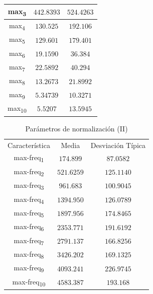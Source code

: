 \documentclass[12pt]{article}
\begin{document}
\begin{table}[!ht]
\begin{tabular}{||c c c||}
			\hline
			max\textsubscript{3} & $442.8393$ & $524.4263$ \\
			\hline
			max\textsubscript{4} & $130.525$ & $192.106$ \\
			\hline
			max\textsubscript{5} & $129.601$ & $179.401$ \\
			\hline
			max\textsubscript{6} & $19.1590$ & $36.384$ \\
			\hline
			max\textsubscript{7} & $22.5892$ & $40.294$ \\
			\hline
			max\textsubscript{8} & $13.2673$ & $21.8992$ \\
			\hline
			max\textsubscript{9} & $5.34739$ & $10.3271$ \\
			\hline
			max\textsubscript{10} & $5.5207$ & $13.5945$ \\
			\hline
		\end{tabular}
	\label{Tab:Features_2_1}
\end{table}

\begin{table}[!ht]
	\caption{Parámetros de normalización (II)}
	\centering
		\begin{tabular}{||c c c||}
			\hline
			Característica & Media & Desviación Típica  \\ [0.5ex]
			max-freq\textsubscript{1} & $174.899$ & $87.0582$ \\
			\hline
			max-freq\textsubscript{2} & $521.6259$ & $125.1140$ \\
			\hline
			max-freq\textsubscript{3} & $961.683$ & $100.9045$ \\
			\hline
			max-freq\textsubscript{4} & $1394.950$ & $126.0789$ \\
			\hline
			max-freq\textsubscript{5} & $1897.956$ & $174.8465$ \\
			\hline
			max-freq\textsubscript{6} & $2353.771$ & $191.6192$ \\
			\hline
			max-freq\textsubscript{7} & $2791.137$ & $166.8256$ \\
			\hline
			max-freq\textsubscript{8} & $3426.202$ & $169.1325$ \\
			\hline
			max-freq\textsubscript{9} & $4093.241$ & $226.9745$ \\
			\hline
			max-freq\textsubscript{10} & $4583.387$ & $193.168$ \\
			\hline
		\end{tabular}
	\label{Tab:Features_2_2}
\end{table}
\end{document}
